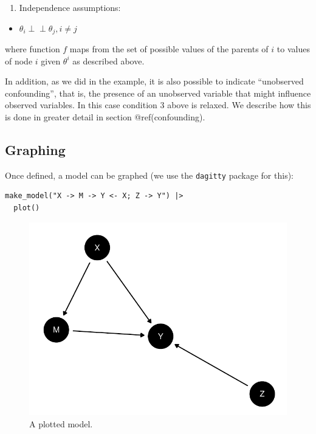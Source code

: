 \documentclass[
  article]{jss}
\providecommand{\tightlist}{%
  \setlength{\itemsep}{0pt}\setlength{\parskip}{0pt}}\usepackage{longtable,booktabs,array}
\begin{document}
\begin{enumerate}
\def\labelenumi{\arabic{enumi}.}
\setcounter{enumi}{2}
\tightlist
\item
  Independence assumptions:\\
\end{enumerate}

\begin{itemize}
\tightlist
\item
  \(\theta_i \perp\!\!\! \perp \theta_j, i\neq j\)
\end{itemize}

where function \(f\) maps from the set of possible values of the parents
of \(i\) to values of node \(i\) given \(\theta^i\) as described above.

In addition, as we did in the \citet{chickering1996clinician} example,
it is also possible to indicate ``unobserved confounding'', that is, the
presence of an unobserved variable that might influence observed
variables. In this case condition 3 above is relaxed. We describe how
this is done in greater detail in section @ref(confounding).

\hypertarget{graphing}{%
\subsection{Graphing}\label{graphing}}

Once defined, a model can be graphed (we use the \texttt{dagitty}
package for this):

\begin{verbatim}
make_model("X -> M -> Y <- X; Z -> Y") |>
  plot()
\end{verbatim}

\begin{figure}[H]

{\centering \includegraphics{paper_files/figure-pdf/unnamed-chunk-7-1.pdf}

}

\caption{A plotted model.}

\end{figure}
\end{document}
